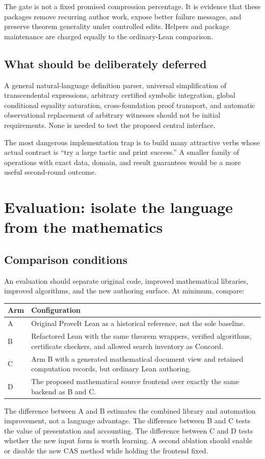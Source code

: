 \documentclass[11pt,a4paper]{article}
\theoremstyle{remark}
\begin{document}
The gate is not a fixed promised compression percentage. It is evidence that
these packages remove recurring author work, expose better failure messages,
and preserve theorem generality under controlled edits. Helpers and package
maintenance are charged equally to the ordinary-Lean comparison.

\subsection{What should be deliberately deferred}
A general natural-language definition parser, universal simplification of
transcendental expressions, arbitrary certified symbolic integration, global
conditional equality saturation, cross-foundation proof transport, and automatic
observational replacement of arbitrary witnesses should not be initial
requirements. None is needed to test the proposed central interface.

The most dangerous implementation trap is to build many attractive verbs whose
actual contract is ``try a large tactic and print success.'' A smaller family of
operations with exact data, domain, and result guarantees would be a more useful
second-round outcome.

\section{Evaluation: isolate the language from the mathematics}
\label{sec:evaluation}
\subsection{Comparison conditions}
An evaluation should separate original code, improved mathematical libraries,
improved algorithms, and the new authoring surface. At minimum, compare:
\begin{center}
\begin{tabularx}{\textwidth}{@{}L{.09\textwidth}Y@{}}
\toprule
Arm & Configuration \\
\midrule
A & Original ProveIt Lean as a historical reference, not the sole baseline.\\
B & Refactored Lean with the same theorem wrappers, verified algorithms,
certificate checkers, and allowed search inventory as Concord.\\
C & Arm B with a generated mathematical document view and retained computation
records, but ordinary Lean authoring.\\
D & The proposed mathematical source frontend over exactly the same backend as
B and C.\\
\bottomrule
\end{tabularx}
\end{center}
The difference between A and B estimates the combined library and automation
improvement, not a language advantage. The difference between B and C tests the
value of presentation and accounting. The difference between C and D tests
whether the new input form is worth learning. A second ablation should enable
or disable the new CAS method while holding the frontend fixed.
\end{document}

